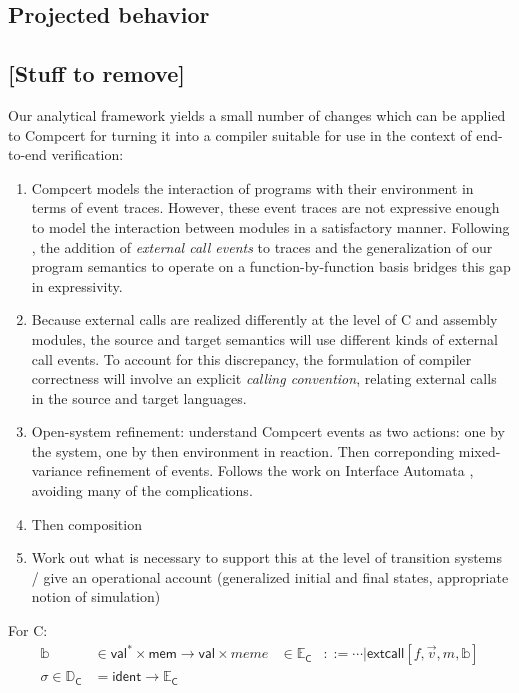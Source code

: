\documentclass[sigplan,10pt,review,anonymous]{acmart}
\newcommand{\kw}[1]{\ensuremath{ \textsf{#1} }}
\begin{document}



\subsection{Projected behavior}


\subsection{[Stuff to remove]}

Our analytical framework
yields a small number of changes
which can be applied to Compcert for
turning it into a compiler suitable for use
in the context of end-to-end verification:
\begin{enumerate}
\item Compcert models the interaction of programs
  with their environment in terms of event traces.
  However,
  these event traces are not expressive enough
  to model the interaction between modules in a satisfactory manner.
  Following \cite{cpp2015},
  the addition of \emph{external call events} to traces
  and the generalization of our program semantics
  to operate on a function-by-function basis
  bridges this gap in expressivity.
\item Because external calls are realized differently
  at the level of C and assembly modules,
  the source and target semantics
  will use different kinds of external call events.
  To account for this discrepancy,
  the formulation of compiler correctness
  will involve an explicit \emph{calling convention},
  relating external calls in the source and target languages.
\item 
  Open-system refinement: understand Compcert events
  as two actions: one by the system, one by then environment in reaction.
  Then correponding mixed-variance refinement of events.
  Follows the work on Interface Automata \cite{ia},
  avoiding many of the complications.
\item
  Then composition
\item
  Work out what is necessary to support this
  at the level of transition systems / give an operational account
  (generalized initial and final states,
  appropriate notion of simulation)
\end{enumerate}

For C:
\begin{align*}
  \mathbb{b} &\in \kw{val}^* \times \kw{mem} \rightarrow \kw{val} \times mem
  e &\in \mathbb{E}_\kw{C} &::=
    \cdots | \kw{extcall}[f, \vec{v}, m, \mathbb{b}] \\
  \sigma \in \mathbb{D}_\kw{C} &=
    \kw{ident} \rightarrow \mathbb{E}_\kw{C}
\end{align*}
\end{document}
